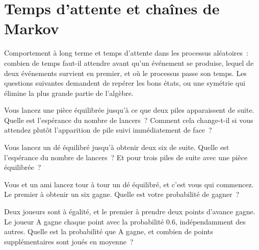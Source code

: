  \chapter{Temps d'attente et chaînes de Markov}\label{ch:iv1:waiting-times-and-markov-chains}

\begin{ivtrains}
Comportement à long terme et temps d'attente dans les processus aléatoires~: combien de temps faut-il attendre avant qu'un événement se produise, lequel de deux événements
survient en premier, et où le processus passe son temps. Les questions suivantes demandent de repérer les bons états, ou une symétrie qui élimine la plus grande partie
de l'algèbre.
\end{ivtrains}

\begin{question}\label{iq:iv1:waiting-times-and-markov-chains:1}
Vous lancez une pièce équilibrée jusqu'à ce que deux piles apparaissent de suite. Quelle est l'espérance du nombre de lancers~? Comment cela change-t-il si vous attendez plutôt
l'apparition de pile suivi immédiatement de face~?
\end{question}

\begin{question}\label{iq:iv1:waiting-times-and-markov-chains:2}
Vous lancez un dé équilibré jusqu'à obtenir deux six de suite. Quelle est l'espérance du nombre de lancers~? Et pour trois piles de suite avec une pièce équilibrée~?
\end{question}

\begin{question}\label{iq:iv1:waiting-times-and-markov-chains:3}
Vous et un ami lancez tour à tour un dé équilibré, et c'est vous qui commencez. Le premier à obtenir un six gagne. Quelle est votre probabilité de gagner~?
\end{question}

\begin{question}\label{iq:iv1:waiting-times-and-markov-chains:4}
Deux joueurs sont à égalité, et le premier à prendre deux points d'avance gagne. Le joueur A gagne chaque point avec la probabilité $0.6$, indépendamment des autres. Quelle est la
probabilité que A gagne, et combien de points supplémentaires sont joués en moyenne~?
\end{question}

